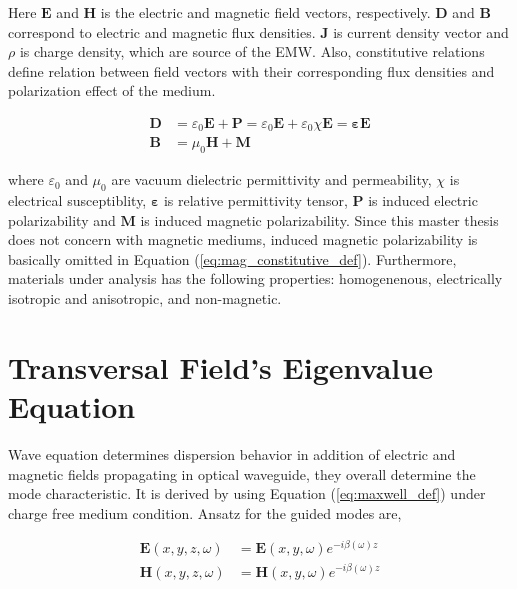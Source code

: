 \documentclass[thesis]{deutez}
\begin{document}
    Here $\mathbf{E}$ and $\mathbf{H}$ is the electric and magnetic field vectors, respectively. $\mathbf{D}$ and $\mathbf{B}$ correspond to electric and magnetic flux densities. $\mathbf{J}$ is current density vector and $\rho$ is charge density, which are source of the EMW. Also, constitutive relations define relation between field vectors with their corresponding flux densities and polarization effect of the medium.  

    \begin{align}
        \mathbf{D} &= \varepsilon_0 \mathbf{E} + \mathbf{P} = \varepsilon_0 \mathbf{E} + \varepsilon_0 \chi \mathbf{E} = \bm{\varepsilon} \mathbf{E} \label{eq:el_constitutive_def}\\
        \mathbf{B} &= \mu_0  \mathbf{H} + \mathbf{M}
       \label{eq:mag_constitutive_def} 
    \end{align}

    
    where $\varepsilon_0$ and $\mu_0$ are vacuum dielectric permittivity and permeability, $\chi$ is electrical susceptiblity, $\bm{\varepsilon}$ is relative permittivity tensor, $\mathbf{P}$ is induced electric polarizability and $\mathbf{M}$ is induced magnetic polarizability. Since this master thesis does not concern with magnetic mediums, induced magnetic polarizability is basically omitted in Equation (\ref{eq:mag_constitutive_def}). Furthermore, materials under analysis has the following properties: homogenenous, electrically isotropic and anisotropic, and non-magnetic.    
    
    \section{Transversal Field's Eigenvalue Equation}

    Wave equation determines dispersion behavior in addition of electric and magnetic fields propagating in optical waveguide, they overall determine the mode characteristic. It is derived by using Equation (\ref{eq:maxwell_def}) under charge free medium condition. Ansatz for the guided modes are, 

    \begin{subequations}\label{eq:eigenval_eq}
        \begin{align}
            \mathbf{E}(x,y,z,\omega) &= \mathbf{E}(x,y,\omega)e^{-i\beta(\omega)z} \label{eq:ansatz_e} \\
            \mathbf{H}(x,y,z,\omega) &= \mathbf{H}(x,y,\omega)e^{-i\beta(\omega)z} \label{eq:ansatz_h}  
        \end{align}
    \end{subequations}
    
\end{document}
